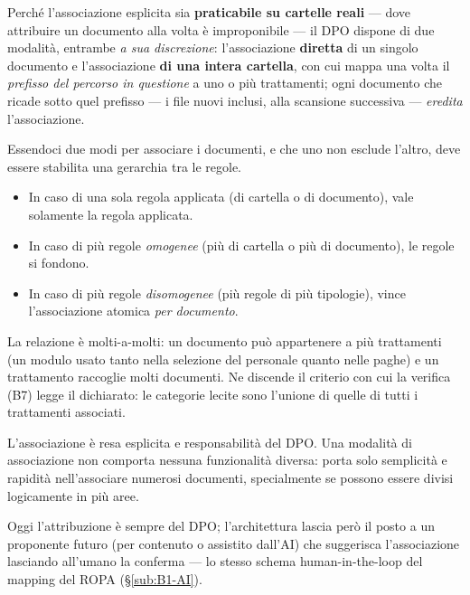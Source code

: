 Perché l'associazione esplicita sia \textbf{praticabile su cartelle reali} --- dove attribuire un documento alla volta è improponibile --- il DPO dispone di due modalità, entrambe \emph{a sua discrezione}: l'associazione \textbf{diretta} di un singolo documento e l'associazione \textbf{di una intera cartella}, con cui mappa una volta il \emph{prefisso del percorso in questione} a uno o più trattamenti; ogni documento che ricade sotto quel prefisso --- i file nuovi inclusi, alla scansione successiva --- \emph{eredita} l'associazione.

Essendoci due modi per associare i documenti, e che uno non esclude l'altro, deve essere stabilita una gerarchia tra le regole.
\begin{itemize}
	\item In caso di una sola regola applicata (di cartella o di documento), vale solamente la regola applicata.
	\item In caso di più regole \emph{omogenee} (più di cartella o più di documento), le regole si fondono.
	\item In caso di più regole \emph{disomogenee} (più regole di più tipologie), vince l'associazione atomica \emph{per documento}.
\end{itemize}

La relazione è molti-a-molti: un documento può appartenere a più trattamenti (un modulo usato tanto nella selezione del personale quanto nelle paghe) e un trattamento raccoglie molti documenti. Ne discende il criterio con cui la verifica (B7) legge il dichiarato: le categorie lecite sono l'unione di quelle di tutti i trattamenti associati.

L'associazione è resa esplicita e responsabilità del DPO. Una modalità di associazione non comporta nessuna funzionalità diversa: porta solo semplicità e rapidità nell'associare numerosi documenti, specialmente se possono essere divisi logicamente in più aree.

Oggi l'attribuzione è sempre del DPO; l'architettura lascia però il posto a un proponente futuro (per contenuto o assistito dall'AI) che suggerisca l'associazione lasciando all'umano la conferma --- lo stesso schema human-in-the-loop del mapping del ROPA (§\ref{sub:B1-AI}).

